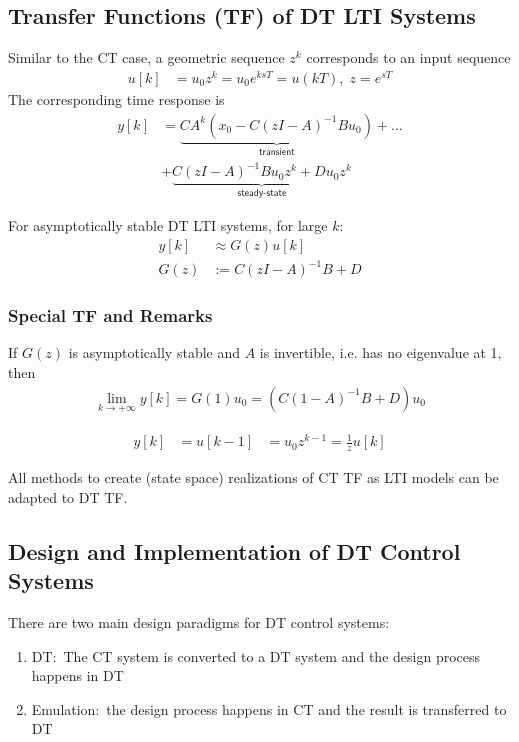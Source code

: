 \subsection{Transfer Functions (TF) of DT LTI Systems}

Similar to the CT case, a geometric sequence $z^k$ corresponds to an input sequence
\noindent\begin{align*}
    u[k] & =u_0z^k=u_0e^{ksT}=u(kT), \; z=e^{sT}
\end{align*}
The corresponding time response is
\noindent\begin{align*}
    y[k] & = \underbrace{CA^k(x_0-C{(zI-A)}^{-1}Bu_0)}_{\textsf{transient}}+\dots \\
         & +\underbrace{C{(zI-A)}^{-1}Bu_0z^k+Du_0z^k}_{\textsf{steady-state}}
\end{align*}

For asymptotically stable DT LTI systems, for large $k$:
\noindent\begin{align*}
    y[k] & \approx G(z)u[k]    \\
    G(z) & :=C{(zI-A)}^{-1}B+D
\end{align*}
\subsubsection{Special TF and Remarks}

If $G(z)$ is asymptotically stable and $A$ is invertible, i.e. has no eigenvalue at 1, then
\noindent\begin{align*}
    \lim_{k\to+\infty}y[k]=G(1)u_0=(C{(1-A)}^{-1}B+D)u_0
\end{align*}
%

\noindent\begin{align*}
    y[k] & =u[k-1] & =u_0z^{k-1}=\frac1zu[k]
\end{align*}

All methods to create (state space) realizations of CT TF as LTI models can be adapted to DT TF.\
%
%
\subsection{Design and Implementation of DT Control Systems}
There are two main design paradigms for DT control systems:
\begin{enumerate}
    \item DT:\ The CT system is converted to a DT system and the design process happens in DT
    \item Emulation:\ the design process happens in CT and the result is transferred to DT
\end{enumerate}
